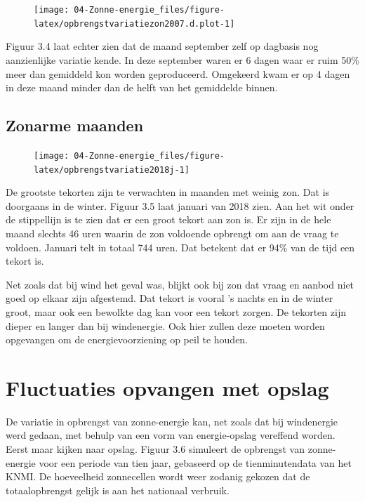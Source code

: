 \documentclass[
  11pt,
  a4paper,
]{book}
\begin{document}
\begin{figure}[b]

{\centering \texttt{[image: 04-Zonne-energie\_files/figure-latex/opbrengstvariatiezon2007.d.plot-1]} 

}

\end{figure}

Figuur 3.4 laat echter zien dat de maand september zelf op dagbasis nog aanzienlijke variatie kende. In deze september waren er 6 dagen waar er ruim 50\% meer dan gemiddeld kon worden geproduceerd. Omgekeerd kwam er op 4 dagen in deze maand minder dan de helft van het gemiddelde binnen.

\hypertarget{zonarme-maanden}{%
\subsection{Zonarme maanden}\label{zonarme-maanden}}

\begin{figure}[b]

{\centering \texttt{[image: 04-Zonne-energie\_files/figure-latex/opbrengstvariatie2018j-1]} 

}

\end{figure}

De grootste tekorten zijn te verwachten in maanden met weinig zon. Dat is doorgaans in de winter. Figuur 3.5 laat januari van 2018 zien. Aan het wit onder de stippellijn is te zien dat er een groot tekort aan zon is. Er zijn in de hele maand slechts 46 uren waarin de zon voldoende opbrengt om aan de vraag te voldoen. Januari telt in totaal 744 uren. Dat betekent dat er 94\% van de tijd een tekort is.

Net zoals dat bij wind het geval was, blijkt ook bij zon dat vraag en aanbod niet goed op elkaar zijn afgestemd. Dat tekort is vooral 's nachts en in de winter groot, maar ook een bewolkte dag kan voor een tekort zorgen. De tekorten zijn dieper en langer dan bij windenergie. Ook hier zullen deze moeten worden opgevangen om de energievoorziening op peil te houden.

\hypertarget{fluctuaties-opvangen-met-opslag-1}{%
\section{Fluctuaties opvangen met opslag}\label{fluctuaties-opvangen-met-opslag-1}}

De variatie in opbrengst van zonne-energie kan, net zoals dat bij windenergie werd gedaan, met behulp van een vorm van energie-opslag vereffend worden. Eerst maar kijken naar opslag. Figuur 3.6 simuleert de opbrengst van zonne-energie voor een periode van tien jaar, gebaseerd op de tienminutendata van het KNMI. De hoeveelheid zonnecellen wordt weer zodanig gekozen dat de totaalopbrengst gelijk is aan het nationaal verbruik.
\end{document}

